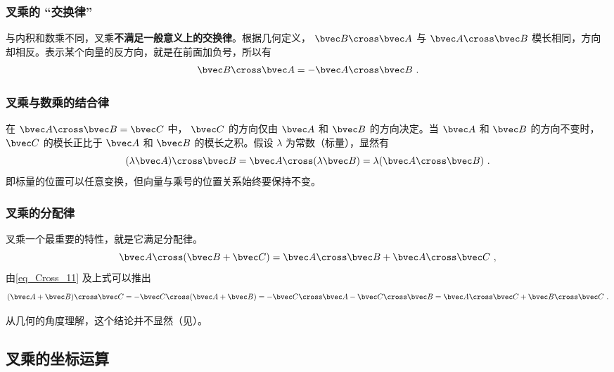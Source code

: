 \subsubsection{叉乘的 “交换律”}
与内积和数乘不同，叉乘\textbf{不满足一般意义上的交换律}。根据几何定义， $\bvec B \cross \bvec A$ 与 $\bvec A \cross \bvec B$ 模长相同，方向却相反。表示某个向量的反方向，就是在前面加负号，所以有
\begin{equation}\label{eq_Cross_11}
\bvec B \cross \bvec A = -\bvec A \cross \bvec B~.
\end{equation}

\subsubsection{叉乘与数乘的结合律}

在 $\bvec A \cross \bvec B = \bvec C$ 中， $\bvec C$ 的方向仅由 $\bvec A$ 和 $\bvec B$ 的方向决定。当 $\bvec A$ 和 $\bvec B$ 的方向不变时， $\bvec C$ 的模长正比于 $\bvec A$ 和 $\bvec B$ 的模长之积。假设 $\lambda $ 为常数（标量），显然有
\begin{equation}
(\lambda \bvec A) \cross \bvec B = \bvec A \cross (\lambda \bvec B) = \lambda (\bvec A \cross \bvec B)~.
\end{equation}
即标量的位置可以任意变换，但向量与乘号的位置关系始终要保持不变。

\subsubsection{叉乘的分配律}

叉乘一个最重要的特性，就是它满足分配律。
\begin{equation}\label{eq_Cross_6}
\bvec A \cross (\bvec B +\bvec C) = \bvec A \cross \bvec B + \bvec A \cross \bvec C~,
\end{equation}
由\autoref{eq_Cross_11} 及上式可以推出
\begin{equation}\label{eq_Cross_7}
(\bvec A + \bvec B) \cross \bvec C =  - \bvec C \cross (\bvec A + \bvec B) =  - \bvec C \cross \bvec A - \bvec C \cross \bvec B = \bvec A \cross \bvec C + \bvec B \cross \bvec C~.
\end{equation}

从几何的角度理解，这个结论并不显然（见）。

\subsection{叉乘的坐标运算}
